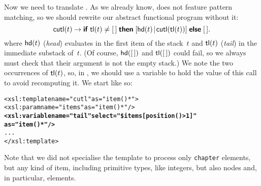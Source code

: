 Now we need to translate . As we already know, \XSLT does
not feature pattern matching, so we should rewrite our abstract
functional program without it:
\begin{equation*}
  \textsf{cutl}(t) \rightarrow \textsf{\textbf{if}} \; \textsf{tl}(t) \neq [\,] \;
  \textsf{\textbf{then}} \; [{\textsf{hd}(t)}\!\mid\!{\textsf{cutl}(\textsf{tl}(t))}] \;
  \textsf{\textbf{else}} \; [\,].
\end{equation*}
where \(\textsf{hd}(t)\) (\emph{head})  evaluates
in the first item of the stack~\(t\) and \(\textsf{tl}(t)\) (\emph{tail})
 in the immediate substack of~\(t\). (Of
course, \(\textsf{hd}([\,])\) and \(\textsf{tl}([\,])\) could fail, so we
always must check that their argument is not the empty stack.) We note
the two occurrences of \(\textsf{tl}(t)\), so, in \XSLT, we should use a
variable to hold the value of this call to avoid recomputing it. We
start like so:
\begin{alltt}
  <xsl:template name="cutl" as="item()*">
    <xsl:param name="items" as="item()*"/>
    \textbf{<xsl:variable name="tail" select="\$items[position()>1]"
                              as="item()*"/>}
    ...
  </xsl:template>
\end{alltt}
Note that we did not specialise the template to process only
\texttt{chapter} elements, but any kind of item, including primitive
types, like integers, but also nodes and, in particular, elements.

